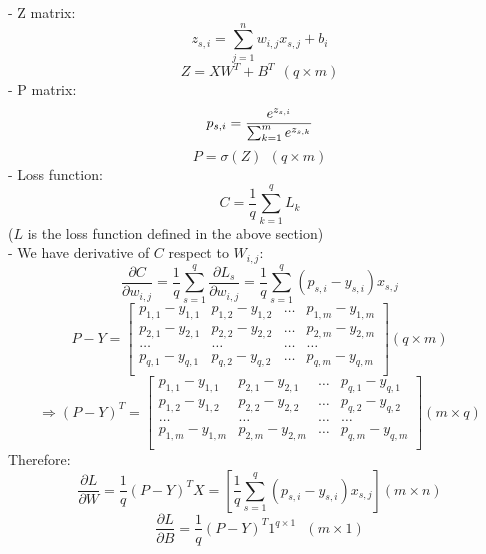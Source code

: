 \documentclass{article}
\begin{document}
    - Z matrix:
    \[
        z_{s, i} = \sum_{j = 1}^{n}w_{i, j}x_{s, j} + b_i
    \]
    \[
        Z = XW^T + B^T \ \ (q \times m)
    \]
    - P matrix:
    \[
        p_{s, i} = \frac{e^{z_{s, i}}}{\sum_{k = 1}^{m}e^{z_{s, k}}} \\  
    \]
    \[
        P = \sigma(Z) \ \ (q \times m)
    \]
    - Loss function:
    \[
        C = \frac{1}{q}\sum_{k = 1}^{q}L_k
    \]
    ($L$ is the loss function defined in the above section)\\
    - We have derivative of $C$ respect to $W_{i, j}$:
    \[
        \frac{\partial C}{\partial w_{i, j}} = 
        \frac{1}{q}\sum_{s = 1}^{q}\frac{\partial L_s}{\partial w_{i, j}} = 
        \frac{1}{q}\sum_{s = 1}^{q}(p_{s, i} - y_{s, i})x_{s, j}
    \] 
    \[
        P - Y = \begin{bmatrix}
            p_{1, 1} - y_{1, 1} & p_{1, 2} - y_{1, 2} & \hdots & p_{1, m} - y_{1, m} \\
            p_{2, 1} - y_{2, 1} & p_{2, 2} - y_{2, 2} & \hdots & p_{2, m} - y_{2, m} \\
            \hdots  & \hdots  & \hdots & \hdots  \\
            p_{q, 1} - y_{q, 1} & p_{q, 2} - y_{q, 2} & \hdots & p_{q, m} - y_{q, m} \\
        \end{bmatrix} (q \times m)
    \]
    \[
        \Rightarrow (P - Y)^T = \begin{bmatrix}
            p_{1, 1} - y_{1, 1} & p_{2, 1} - y_{2, 1} & \hdots & p_{q, 1} - y_{q, 1} \\
            p_{1, 2} - y_{1, 2} & p_{2, 2} - y_{2, 2} & \hdots & p_{q, 2} - y_{q, 2} \\
            \hdots  & \hdots  & \hdots & \hdots  \\
            p_{1, m} - y_{1, m} & p_{2, m} - y_{2, m} & \hdots & p_{q, m} - y_{q, m} \\
        \end{bmatrix} (m \times q)
    \]
    Therefore:
    \[
        \frac{\partial L}{\partial W} = \frac{1}{q}(P - Y)^TX = 
        \left[\frac{1}{q}\sum_{s = 1}^{q}(p_{s, i} - y_{s, i})x_{s, j}\right] (m \times n)
    \]
    \[
        \frac{\partial L}{\partial B} =  \frac{1}{q}(P - Y)^T1^{q \times 1} 
        \ \ \ (m \times 1)
    \] 
\end{document}
